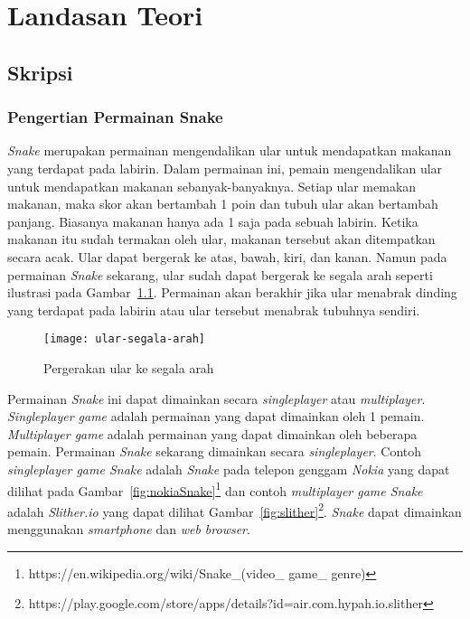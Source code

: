 \chapter{Landasan Teori}
\label{chap:teori}

\section{Skripsi}
\label{sec:skripsi} 
 
\subsection{Pengertian Permainan Snake}
\textit{Snake} merupakan permainan mengendalikan ular untuk mendapatkan makanan yang terdapat pada labirin. Dalam permainan ini, pemain mengendalikan ular untuk mendapatkan makanan sebanyak-banyaknya. Setiap ular memakan makanan, maka skor akan bertambah 1 poin dan tubuh ular akan bertambah panjang. Biasanya makanan hanya ada 1 saja pada sebuah labirin. Ketika makanan itu sudah termakan oleh ular, makanan tersebut akan ditempatkan secara acak. Ular dapat bergerak ke atas, bawah, kiri, dan kanan. Namun pada permainan \textit{Snake} sekarang, ular sudah dapat bergerak ke segala arah seperti ilustrasi pada Gambar~\ref{fig:ularSegalaArah}. Permainan akan berakhir jika ular menabrak dinding yang terdapat pada labirin atau ular tersebut menabrak tubuhnya sendiri. \\

\begin{figure}[H]
	\centering  
	\texttt{[image: ular-segala-arah]}  
	\caption[Pergerakan ular ke segala arah]{Pergerakan ular ke segala arah} 
	\label{fig:ularSegalaArah} 
\end{figure} 

Permainan \textit{Snake} ini dapat dimainkan secara \textit{singleplayer} atau \textit{multiplayer}. \textit{Singleplayer game} adalah permainan yang dapat dimainkan oleh 1 pemain. \textit{Multiplayer game} adalah permainan yang dapat dimainkan oleh beberapa pemain. Permainan \textit{Snake} sekarang dimainkan secara \textit{singleplayer}. Contoh \textit{singleplayer game Snake} adalah \textit{Snake} pada telepon genggam \textit{Nokia} yang dapat dilihat pada Gambar~\ref{fig:nokiaSnake}\footnote{https://en.wikipedia.org/wiki/Snake\_(video\_ game\_ genre)} dan contoh \textit{multiplayer game Snake} adalah \textit{Slither.io} yang dapat dilihat Gambar~\ref{fig:slither}\footnote{https://play.google.com/store/apps/details?id=air.com.hypah.io.slither}. \textit{Snake} dapat dimainkan menggunakan \textit{smartphone} dan \textit{web browser}.  

